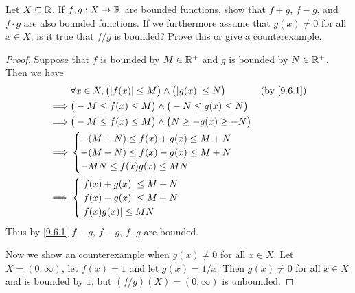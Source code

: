 \begin{ex}\label{ex:9.6.2}
  Let \(X \subseteq \mathbb{R}\).
  If \(f, g: X \to \mathbb{R}\) are bounded functions, show that \(f + g\), \(f - g\), and \(f \cdot g\) are also bounded functions.
  If we furthermore assume that \(g(x) \neq 0\) for all \(x \in X\), is it true that \(f / g\) is bounded?
  Prove this or give a counterexample.
\end{ex}

\begin{proof}
  Suppose that \(f\) is bounded by \(M \in \mathbb{R}^+\) and \(g\) is bounded by \(N \in \mathbb{R}^+\).
  Then we have
  \begin{align*}
             & \forall x \in X, \big(\abs{f(x)} \leq M\big) \land \big(\abs{g(x)} \leq N\big) & \text{(by \cref{9.6.1})} \\
    \implies & \big(-M \leq f(x) \leq M\big) \land \big(-N \leq g(x) \leq N\big)                                         \\
    \implies & \big(-M \leq f(x) \leq M\big) \land \big(N \geq -g(x) \geq -N\big)                                        \\
    \implies & \begin{cases}
                 -(M + N) \leq f(x) + g(x) \leq M + N \\
                 -(M + N) \leq f(x) - g(x) \leq M + N \\
                 -MN \leq f(x) g(x) \leq MN
               \end{cases}                                                                      \\
    \implies & \begin{cases}
                 \abs{f(x) + g(x)} \leq M + N \\
                 \abs{f(x) - g(x)} \leq M + N \\
                 \abs{f(x) g(x)} \leq MN
               \end{cases}
  \end{align*}
  Thus by \cref{9.6.1} \(f + g\), \(f - g\), \(f \cdot g\) are bounded.

  Now we show an counterexample when \(g(x) \neq 0\) for all \(x \in X\).
  Let \(X = (0, \infty)\), let \(f(x) = 1\) and let \(g(x) = 1 / x\).
  Then \(g(x) \neq 0\) for all \(x \in X\) and is bounded by \(1\), but \((f / g)(X) = (0, \infty)\) is unbounded.
\end{proof}